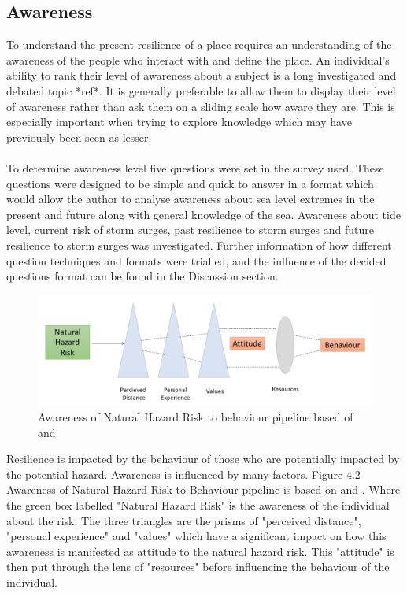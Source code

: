 \subsection{Awareness}
To understand the present resilience of a place requires an understanding of the awareness of the people who interact with and define the place. An individual’s ability to rank their level of awareness about a subject is a long investigated and debated topic *ref*. It is generally preferable to allow them to display their level of awareness rather than ask them on a sliding scale how aware they are. This is especially important when trying to explore knowledge which may have previously been seen as lesser.

\paragraph{}
To determine awareness level five questions were set in the survey used. These questions were designed to be simple and quick to answer in a format which would allow the author to analyse awareness about sea level extremes in the present and future along with general knowledge of the sea. Awareness about tide level, current risk of storm surges, past resilience to storm surges and future resilience to storm surges was investigated. Further information of how different question techniques and formats were trialled, and the influence of the decided questions format can be found in the Discussion section.

\begin{figure}[h]
    \centering
    \includegraphics[width=1\textwidth]{fig_theory/awareness lujala and whitmarsh.png}
     \caption{Awareness of Natural Hazard Risk to behaviour pipeline based of \cite{lujala_climate_2015} and \cite{whitmarsh_are_2008}}
    \label{fig:my_awareness}
\end{figure}

Resilience is impacted by the behaviour of those who are potentially impacted by the potential hazard. Awareness is influenced by many factors. Figure 4.2 Awareness of Natural Hazard Risk to Behaviour pipeline is based on \cite{whitmarsh_are_2008} and \cite{lujala_climate_2015} . Where the green box labelled "Natural Hazard Risk" is the awareness of the individual about the risk. The three triangles are the prisms of "perceived distance", "personal experience" and "values" which have a significant impact on how this awareness is manifested as attitude to the natural hazard risk. This "attitude" is then put through the lens of "resources" before influencing the behaviour of the individual. 

